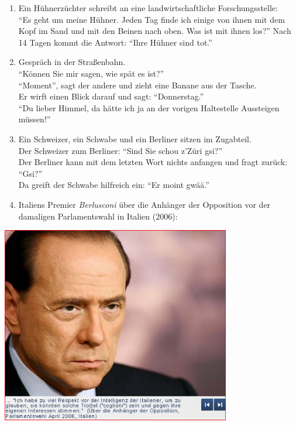 \documentclass[
  letterpaper,
  DIV=11,
  numbers=noendperiod]{scrreprt}
\begin{document}
\begin{enumerate}
\def\labelenumi{(\arabic{enumi})}
\setcounter{enumi}{12}
\item
  Ein Hühnerzüchter schreibt an eine landwirtschaftliche
  Forschungsstelle:\\
  ``Es geht um meine Hühner. Jeden Tag finde ich einige von ihnen mit
  dem Kopf im Sand und mit den Beinen nach oben. Was ist mit ihnen
  los?'' Nach 14 Tagen kommt die Antwort: ``Ihre Hühner sind tot.''
\item
  Gespräch in der Straßenbahn.\\
  ``Können Sie mir sagen, wie spät es ist?''\\
  ``Moment'', sagt der andere und zieht eine Banane aus der Tasche.\\
  Er wirft einen Blick darauf und sagt: ``Donnerstag.''\\
  ``Du lieber Himmel, da hätte ich ja an der vorigen Haltestelle
  Aussteigen müssen!''
\item
  Ein Schweizer, ein Schwabe und ein Berliner sitzen im Zugabteil.\\
  Der Schweizer zum Berliner: ``Sind Sie schou z'Züri gsi?''\\
  Der Berliner kann mit dem letzten Wort nichts anfangen und fragt
  zurück: ``Gsi?''\\
  Da greift der Schwabe hilfreich ein: ``Er moint gwää.''
\item
  Italiens Premier \emph{Berlusconi} über die Anhänger der Opposition
  vor der damaligen Parlamentswahl in Italien (2006):
\end{enumerate}

\includegraphics[width=0.75\textwidth,height=\textheight]{./pictures/textkriterien_9.png}
\end{document}
